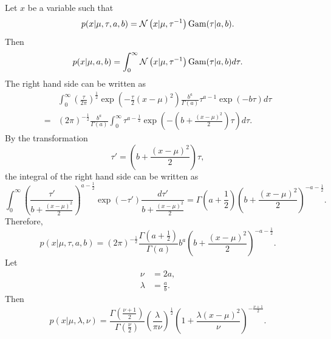 \subsection{}
\label{2.46}
Let $x$ be a variable such that
%
\begin{equation}
p(x | \mu, \tau, a, b)
=
\mathcal{N} 
\left(
	x 
	| 
	\mu, 
	\tau ^ {- 1}
\right)
{\rm Gam} (\tau | a, b).
\end{equation}
%
Then
%
\begin{equation}
p(x | \mu, a, b)
=
\int_{0}^{\infty}
\mathcal{N} 
\left(
	x 
	| 
	\mu, 
	\tau ^ {- 1}
\right)
{\rm Gam} (\tau | a, b)
d\tau.
\end{equation}
%
The right hand side can be written as
%
\begin{equation}
\begin{aligned}
&
\int_{0}^{\infty}
\left(
	\frac{\tau}{2 \pi}
\right) ^ \frac{1}{2}
\exp
\left(
	-
	\frac{\tau}{2} 
	(x - \mu) ^ 2
\right)
\frac{b ^ a}{\Gamma(a)}
\tau ^ {a - 1}
\exp (- b \tau)
d\tau 
\\
=&
(2 \pi) ^ {- \frac{1}{2}}
\frac{b ^ a}{\Gamma(a)}
\int_{0}^{\infty}
\tau ^ {a - \frac{1}{2}}
\exp
\left(
	-
	\left(
		b
		+
		\frac{(x - \mu) ^ 2}{2}
	\right)
	\tau
\right)
d\tau.
\end{aligned}
\end{equation}
%
By the transformation
%
\begin{equation}
\tau'
=
\left(
		b
		+
		\frac{(x - \mu) ^ 2}{2}
	\right)
\tau,
\end{equation}
%
the integral of the right hand side can be written as
%
\begin{equation}
\int_{0}^{\infty}
\left(
	\frac{\tau'}{b + \frac{(x - \mu) ^ 2}{2}}
\right) ^ {a - \frac{1}{2}}
\exp (- \tau')
\frac{d\tau'}{b + \frac{(x - \mu) ^ 2}{2}}
=
\Gamma
\left(
	a 
	+
	\frac{1}{2}
\right)
\left(
	b 
	+ 
	\frac{(x - \mu) ^ 2}{2}
\right) ^ {- a - \frac{1}{2}}.
\end{equation}
%
Therefore,
%
\begin{equation}
p(x | \mu, \tau, a, b)
=
(2 \pi) ^ {- \frac{1}{2}}
\frac{\Gamma(a + \frac{1}{2})}
{\Gamma(a)}
b ^ a
\left(
	b 
	+ 
	\frac{(x - \mu) ^ 2}{2}
\right) ^ {- a - \frac{1}{2}}.
\end{equation}
%
Let
%
\begin{equation}
\begin{aligned}
\nu
&=
2 a, 
\\
\lambda
&=
\frac{a}{b}.
\end{aligned}
\end{equation}
%
Then
%
\begin{equation}
p(x | \mu, \lambda, \nu)
=
\frac{\Gamma(\frac{\nu + 1}{2})}{\Gamma(\frac{\nu}{2})}
\left(
	\frac{\lambda}{\pi \nu}
\right) ^ {\frac{1}{2}}
\left(
	1 
	+ 
	\frac{\lambda (x - \mu) ^ 2}{\nu}
\right) ^ {- \frac{\nu + 1}{2}}.
\end{equation}
%


